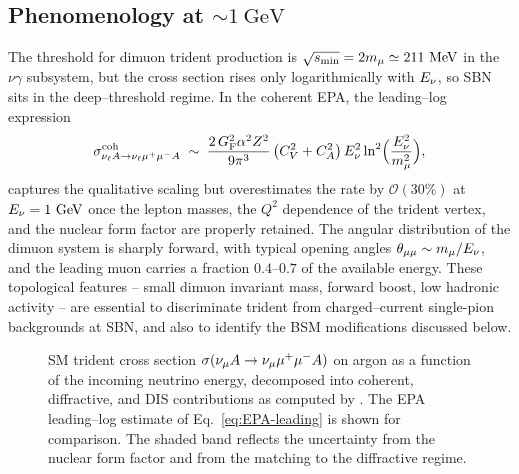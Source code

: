 \subsection{Phenomenology at $\sim 1~\text{GeV}$}

The threshold for dimuon trident production is $\sqrt{s_{\rm min}}
= 2 m_\mu \simeq 211~\text{MeV}$ in the $\nu\gamma$ subsystem, but the
cross section rises only logarithmically with $E_\nu$, so SBN sits in
the deep--threshold regime.  In the coherent EPA, the leading--log
expression
\begin{equation}
  \sigma^{\rm coh}_{\nu_\ell A \to \nu_\ell \mu^+\mu^- A}
  \;\sim\;
  \frac{2\,G_{\rm F}^2 \alpha^2 Z^2}{9\pi^3}\,
  \big(C_V^2 + C_A^2\big)\,
  E_\nu^2 \ln^2\!\Big(\frac{E_\nu^2}{m_\mu^2}\Big),
  \label{eq:EPA-leading}
\end{equation}
captures the qualitative scaling but overestimates the rate by
$\mathcal{O}(30\%)$ at $E_\nu = 1~\text{GeV}$ once the lepton masses,
the $Q^2$ dependence of the trident vertex, and the nuclear form factor
are properly retained.  The angular distribution of the dimuon system
is sharply forward, with typical opening angles $\theta_{\mu\mu}
\sim m_\mu/E_\nu$, and the leading muon carries a fraction
$0.4$--$0.7$ of the available energy.  These topological features --
small dimuon invariant mass, forward boost, low hadronic activity --
are essential to discriminate trident from charged--current single-pion
backgrounds at SBN, and also to identify the BSM modifications
discussed below.

\begin{figure}[t]
  \centering
  \caption{SM trident cross section
    $\sigma(\nu_\mu A \to \nu_\mu \mu^+ \mu^- A)$ on argon as a function of
    the incoming neutrino energy, decomposed into coherent,
    diffractive, and DIS contributions as computed by \Neptune.  The
    EPA leading--log estimate of Eq.~\eqref{eq:EPA-leading} is shown
    for comparison.  The shaded band reflects the uncertainty from the
    nuclear form factor and from the matching to the diffractive
    regime.}
  \label{fig:smxsec}
\end{figure}

